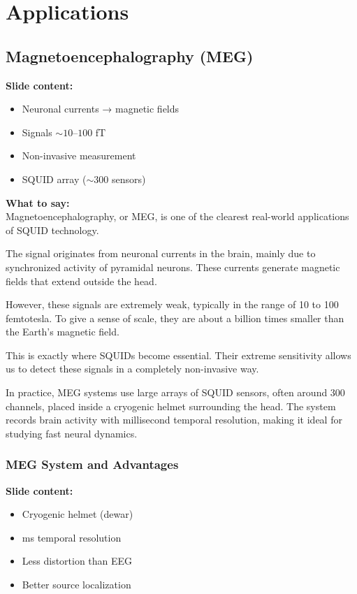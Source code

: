 \documentclass[11pt,a4paper]{article}
\newcommand{\points}[1]{{\color{accent}\textbf{Slide content:}}\\#1}
\newcommand{\speech}[1]{{\color{accent}\textbf{What to say:}}\\#1}
\begin{document}


\section{Applications}
\subsection{Magnetoencephalography (MEG)}

\points{
\begin{itemize}
\item Neuronal currents → magnetic fields
\item Signals $\sim 10$--$100$ fT
\item Non-invasive measurement
\item SQUID array ($\sim$300 sensors)
\end{itemize}
}

\speech{
Magnetoencephalography, or MEG, is one of the clearest real-world applications of SQUID technology.

The signal originates from neuronal currents in the brain, mainly due to synchronized activity of pyramidal neurons. These currents generate magnetic fields that extend outside the head.

However, these signals are extremely weak, typically in the range of 10 to 100 femtotesla. To give a sense of scale, they are about a billion times smaller than the Earth's magnetic field.

This is exactly where SQUIDs become essential. Their extreme sensitivity allows us to detect these signals in a completely non-invasive way.

In practice, MEG systems use large arrays of SQUID sensors, often around 300 channels, placed inside a cryogenic helmet surrounding the head. The system records brain activity with millisecond temporal resolution, making it ideal for studying fast neural dynamics.
}


\subsubsection{MEG System and Advantages}

\points{
\begin{itemize}
\item Cryogenic helmet (dewar)
\item ms temporal resolution
\item Less distortion than EEG
\item Better source localization
\end{itemize}
}
\end{document}

